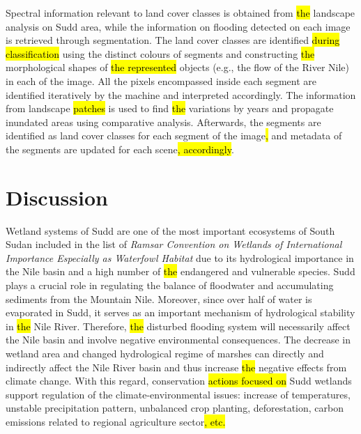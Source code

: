 \documentclass[sustainability,article,submit,pdftex,moreauthors]{Definitions/mdpi}
\begin{document}
Spectral information relevant to land cover classes is obtained from \hl{the }landscape analysis on Sudd area, while the information on flooding detected on each image is retrieved through segmentation. The land cover classes are identified \hl{during classification }using the distinct colours of\hl{ }segments and constructing \hl{the }morphological shapes of \hl{the represented} objects (e.g., the flow of the River Nile) in each of the image. All the pixels encompassed inside each segment are identified iteratively by the machine and interpreted accordingly. The information from landscape \hl{patches} is used to find \hl{the }variations by years and propagate inundated areas using comparative analysis. Afterwards, the segments are identified as land cover classes for each segment of the image\hl{, }and metadata of the segments are updated for each scene\hl{, accordingly}. 

\section{Discussion}

Wetland systems of Sudd are one of the most important ecosystems of South Sudan included in the list of \emph{Ramsar Convention on Wetlands of International Importance Especially as Waterfowl Habitat} due to its\hl{ }hydrological importance in the Nile basin and a high number of \hl{the }endangered and vulnerable species. Sudd plays a crucial role in regulating the balance of floodwater and accumulating sediments from the Mountain Nile. Moreover, since over half of water is evaporated in Sudd, it serves as an important mechanism of hydrological stability in \hl{the }Nile River. Therefore, \hl{the }disturbed flooding system will necessarily affect the Nile basin and involve negative environmental consequences. The decrease in wetland area and changed hydrological regime of marshes can directly and indirectly affect the Nile River basin and thus increase \hl{the }negative effects from climate change. With this regard,\hl{ }conservation \hl{actions focused on }Sudd wetlands support regulation of the climate-environmental issues: increase of temperatures, unstable precipitation pattern, unbalanced crop planting, deforestation, carbon emissions related to regional agriculture sector\hl{, etc. }
\end{document}
